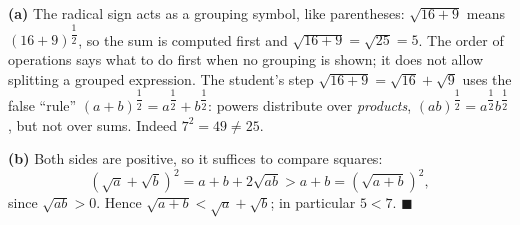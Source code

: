 \textbf{(a)} The radical sign acts as a grouping symbol, like parentheses: $\sqrt{16+9}$ means $(16+9)^{\dfrac{1}{2}}$, so the sum is computed first and $\sqrt{16+9}=\sqrt{25}=\boxed{5}$. The order of operations says what to do first when no grouping is shown; it does not allow splitting a grouped expression. The student's step $\sqrt{16+9}=\sqrt{16}+\sqrt9$ uses the false ``rule'' $(a+b)^{\dfrac{1}{2}}=a^{\dfrac{1}{2}}+b^{\dfrac{1}{2}}$: powers distribute over \emph{products}, $(ab)^{\dfrac{1}{2}}=a^{\dfrac{1}{2}}b^{\dfrac{1}{2}}$, but not over sums. Indeed $7^2=49\ne25$.

\textbf{(b)} Both sides are positive, so it suffices to compare squares:
\[
\left(\sqrt a+\sqrt b\right)^2=a+b+2\sqrt{ab}>a+b=\left(\sqrt{a+b}\right)^2,
\]
since $\sqrt{ab}>0$. Hence $\sqrt{a+b}<\sqrt a+\sqrt b$; in particular $5<7$. $\blacksquare$
